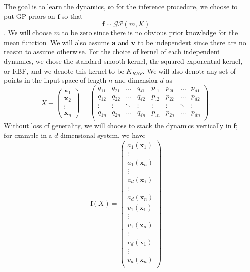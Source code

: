 \documentclass{statsmsc}
\begin{document}
The goal is to learn the dynamics, so for the inference procedure, we choose to put GP priors on $\mathbf{f}$ so that $$\mathbf{f}\sim\mathcal{GP}(m, K)$$.
We will choose $m$ to be zero since there is no obvious prior knowledge for the mean function.
We will also assume $\mathbf{a}$ and $\mathbf{v}$ to be independent since there are no reason to assume otherwise. 
For the choice of kernel of each independent dynamics, we chose the standard smooth kernel, the squared exponential kernel, or RBF, and we denote this kernel to be $K_{RBF}$. 
We will also denote any set of points in the input space of length $n$ and dimension $d$ as $$X\equiv\begin{pmatrix}
    \mathbf{x}_1\\\mathbf{x}_2\\\vdots\\\mathbf{x}_n
\end{pmatrix}=\begin{pmatrix}
    q_{11}& q_{21} &\dots& q_{d1} & p_{11} & p_{21} & \dots & p_{d1} \\
    q_{12}& q_{22} &\dots& q_{d2} & p_{12} & p_{22} & \dots & p_{d2} \\
    \vdots &\vdots &\ddots &\vdots &\vdots &\vdots &\ddots &\vdots \\
    q_{1n}& q_{2n} &\dots& q_{dn} & p_{1n} & p_{2n} & \dots & p_{dn} \\
\end{pmatrix}.$$
Without loss of generality, we will choose to stack the dynamics vertically in $\mathbf{f}$; for example in a $d$-dimensional system, we have \begin{equation}\mathbf{f}(X)=\begin{pmatrix}
    a_1(\mathbf{x}_1)\\
    \vdots\\
    a_1(\mathbf{x}_n)\\
    \vdots\\
    a_d(\mathbf{x}_1)\\
    \vdots\\
    a_d(\mathbf{x}_n)\\
    v_1(\mathbf{x}_1)\\
    \vdots\\
    v_1(\mathbf{x}_n)\\
    \vdots\\
    v_d(\mathbf{x}_1)\\
    \vdots\\
    v_d(\mathbf{x}_n)\\
\end{pmatrix}\label{equ:stacked}\end{equation}
\end{document}
